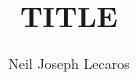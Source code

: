 \documentclass[12pt,a4paper]{article}
\begin{document}


\title{TITLE}

\onehalfspacing{}

\author{Neil Joseph Lecaros}




\newcommand{\cpd}{%
	\stepcounter{bar}%
	\textbf{\thebar}%
}

\end{document}
